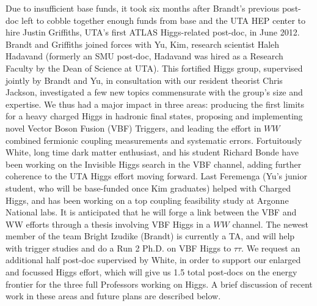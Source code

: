 Due to insufficient base funds, it took six months after Brandt's previous post-doc left to cobble together enough funds from base and the UTA HEP center to hire Justin Griffiths,  UTA's first ATLAS Higgs-related post-doc, in June 2012. Brandt and Griffiths joined forces with Yu, Kim,  research scientist Haleh Hadavand (formerly an SMU post-doc, Hadavand was hired as a Research Faculty by the Dean of Science at UTA). This fortified Higgs group, supervised jointly by Brandt and Yu, in consultation with our resident theorist Chris Jackson, investigated a few new topics commensurate with the group's size and expertise.  We thus had a major impact in three areas: producing the first limits for a heavy charged Higgs in hadronic final states, proposing and implementing novel Vector Boson Fusion (VBF) Triggers, and leading the effort in $WW$ combined fermionic coupling measurements and systematic errors. Fortuitously White,  long time dark matter enthusiast, and his student Richard Bonde have been working on the Invisible Higgs search in the VBF channel, adding further coherence to the UTA Higgs effort moving forward.  Last Feremenga (Yu's junior student, who will be base-funded once Kim graduates)  helped with Charged Higgs, and has been working on a top coupling feasibility study at Argonne National labs. It is anticipated that he will forge a link between the VBF and WW efforts through a thesis involving VBF Higgs in a  $WW$ channel. The newest member of the team Bright Izudike (Brandt) is currently a TA, and will help with trigger studies and do a Run 2 Ph.D. on VBF Higgs to $\tau\tau$.  We request an additional half post-doc supervised by White,  in order to support our enlarged and focussed Higgs effort, which will give us 1.5 total post-docs on the energy frontier for the three full Professors working on Higgs. A brief discussion of recent work in these areas and future plans are described below.
